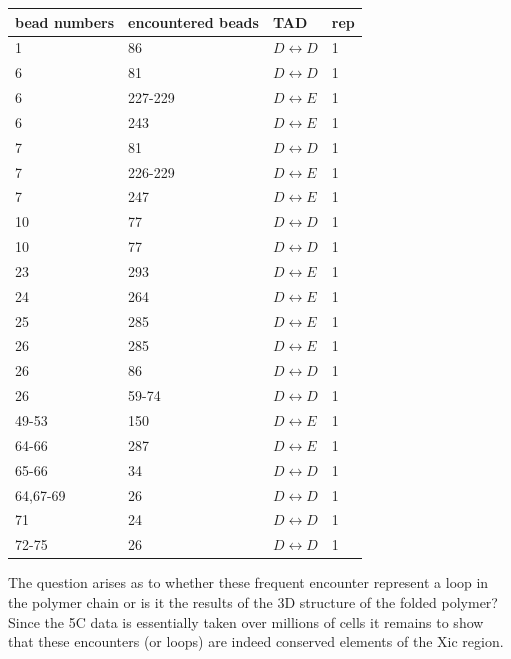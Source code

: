 \documentclass[12pt]{book}
\begin{document}
\begin{table}[H]
\begin{tabular}{l l l l}
bead numbers & encountered beads & TAD & rep\\
\hline
1       & 86      & $D\leftrightarrow D$& 1 \\
6       & 81      & $D\leftrightarrow D$& 1 \\
6       & 227-229 & $D\leftrightarrow E$& 1 \\
6       & 243     & $D\leftrightarrow E$& 1 \\
7       & 81      & $D\leftrightarrow D$& 1 \\
7       & 226-229 & $D\leftrightarrow E$& 1 \\
7       & 247     & $D\leftrightarrow E$& 1 \\
10      & 77      & $D\leftrightarrow D$& 1 \\
10      & 77      & $D\leftrightarrow D$& 1 \\
23      & 293     & $D\leftrightarrow E$& 1 \\
24      & 264     & $D\leftrightarrow E$& 1 \\
25      & 285     & $D\leftrightarrow E$& 1 \\
26      & 285     & $D\leftrightarrow E$& 1 \\
26      & 86      & $D\leftrightarrow D$& 1 \\
26      & 59-74   & $D\leftrightarrow D$& 1 \\
49-53   & 150     & $D\leftrightarrow E$& 1 \\
64-66   & 287     & $D\leftrightarrow E$& 1 \\
65-66   & 34      & $D\leftrightarrow D$& 1 \\ 
64,67-69& 26      & $D\leftrightarrow D$& 1 \\       
71      & 24      & $D\leftrightarrow D$& 1 \\
72-75   & 26      & $D\leftrightarrow D$& 1 \\

\end{tabular}
\end{table}

The question arises as to whether these frequent encounter represent a loop in the polymer chain or is it the results of the 3D structure of the folded polymer? Since the 5C data is essentially taken over millions of cells it remains to show that these encounters (or loops) are indeed conserved elements of the Xic region.
\end{document}
